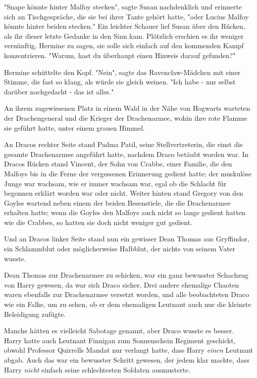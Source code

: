 {"Snape könnte hinter Malfoy stecken", sagte Susan nachdenklich und erinnerte sich an Tischgespräche, die sie bei ihrer Tante gehört hatte, "oder Lucius Malfoy könnte hinter beiden stecken." Ein leichter Schauer lief Susan über den Rücken, als ihr dieser letzte Gedanke in den Sinn kam. Plötzlich erschien es ihr weniger vernünftig, Hermine zu sagen, sie solle sich einfach auf den kommenden Kampf konzentrieren. "Warum, hast du überhaupt einen Hinweis darauf gefunden?"

Hermine schüttelte den Kopf. "Nein", sagte das Ravenclaw-Mädchen mit einer Stimme, die fast so klang, als würde sie gleich weinen. "Ich habe - nur selbst darüber nachgedacht - das ist alles."

An ihrem zugewiesenen Platz in einem Wald in der Nähe von Hogwarts warteten der Drachengeneral und die Krieger der Drachenarmee, wohin ihre rote Flamme sie geführt hatte, unter einem grauen Himmel.

An Dracos rechter Seite stand Padma Patil, seine Stellvertreterin, die einst die gesamte Drachenarmee angeführt hatte, nachdem Draco betäubt worden war. In Dracos Rücken stand Vincent, der Sohn von Crabbe, einer Familie, die den Malfoys bis in die Ferne der vergessenen Erinnerung gedient hatte; der muskulöse Junge war wachsam, wie er immer wachsam war, egal ob die Schlacht für begonnen erklärt worden war oder nicht. Weiter hinten stand Gregory von den Goyles wartend neben einem der beiden Besenstiele, die die Drachenarmee erhalten hatte; wenn die Goyles den Malfoys auch nicht so lange gedient hatten wie die Crabbes, so hatten sie doch nicht weniger gut gedient.

Und an Dracos linker Seite stand nun ein gewisser Dean Thomas aus Gryffindor, ein Schlammblut oder möglicherweise Halbblut, der nichts von seinem Vater wusste.

Dean Thomas zur Drachenarmee zu schicken, war ein ganz bewusster Schachzug von Harry gewesen, da war sich Draco sicher. Drei andere ehemalige Chaoten waren ebenfalls zur Drachenarmee versetzt worden, und alle beobachteten Draco wie ein Falke, um zu sehen, ob er dem ehemaligen Leutnant auch nur die kleinste Beleidigung zufügte.

Manche hätten es vielleicht Sabotage genannt, aber Draco wusste es besser. Harry hatte auch Leutnant Finnigan zum Sonnenschein Regiment geschickt, obwohl Professor Quirrells Mandat nur verlangt hatte, dass Harry \emph{einen} Leutnant abgab. Auch das war ein bewusster Schritt gewesen, der jedem klar machte, dass Harry \emph{nicht} einfach seine schlechtesten Soldaten ausmusterte.

}
